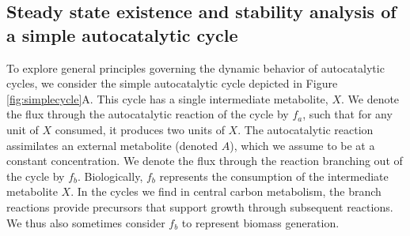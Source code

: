 \subsection{Steady state existence and stability analysis of a simple autocatalytic cycle}
To explore general principles governing the dynamic behavior of autocatalytic cycles, we consider the simple autocatalytic cycle depicted in Figure \ref{fig:simplecycle}A.
This cycle has a single intermediate metabolite, $X$.
We denote the flux through the autocatalytic reaction of the cycle by $f_a$, such that for any unit of $X$ consumed, it produces two units of $X$.
The autocatalytic reaction assimilates an external metabolite (denoted $A$), which we assume to be at a constant concentration.
We denote the flux through the reaction branching out of the cycle by $f_b$.
Biologically, $f_b$ represents the consumption of the intermediate metabolite $X$.
In the cycles we find in central carbon metabolism, the branch reactions provide precursors that support growth through subsequent reactions.
We thus also sometimes consider $f_b$ to represent biomass generation.

